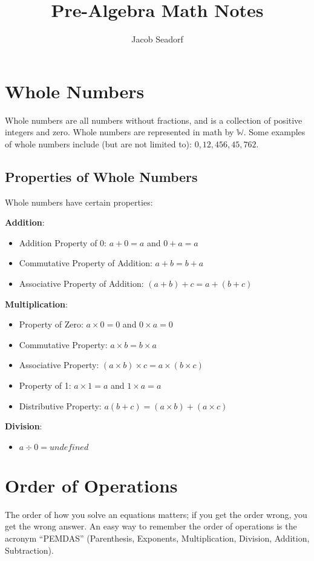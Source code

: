 \documentclass[letterpaper, 10pt]{article}
\author{Jacob Seadorf}
\title{Pre-Algebra Math Notes}
\begin{document}
\maketitle
\section{Whole Numbers}
	Whole numbers are all numbers without fractions, and is a collection of positive integers and zero. Whole numbers are represented in math by $\mathbb{W}$. Some examples of whole numbers include (but are not limited to): $0, 12, 456, 45,762$.

	\subsection{Properties of Whole Numbers}
	Whole numbers have certain properties:
	
	\textbf{Addition}:
	\begin{itemize}
		\item Addition Property of 0: $a + 0 = a$ and $0 + a = a$
		\item Commutative Property of Addition: $a + b = b + a$
		\item Associative Property of Addition: $(a + b) + c = a + (b + c)$
	\end{itemize}
	
	\textbf{Multiplication}:
	\begin{itemize}
		\item Property of Zero: $a \times 0 = 0$ and $0 \times a = 0$
		\item Commutative Property: $a \times b = b \times a$
		\item Associative Property: $(a \times b) \times c = a \times (b \times c)$
		\item Property of 1: $a \times 1 = a$ and $1 \times a = a$
		\item Distributive Property: $a(b + c) = (a \times b) + (a \times c)$
	\end{itemize}

	\textbf{Division}:
		\begin{itemize}
		\item $a \div 0 = undefined$
		\end{itemize}
\section{Order of Operations}
	The order of how you solve an equations matters; if you get the order wrong, you get the wrong answer. An easy way to remember the order of operations is the acronym ``PEMDAS'' (Parenthesis, Exponents, Multiplication, Division, Addition, Subtraction). 
\end{document}
